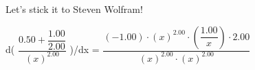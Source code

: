 \documentclass[a4paper]{article}
\begin{document}
\newpage

 Let's stick it to Steven Wolfram!

d( $
\dfrac{ 0.50 + \dfrac{ 1.00 }{ 2.00 }  }{  \left( x \right)^{2.00 }  } $
)/dx = $
\dfrac{ (-1.00) \cdot  \left( x \right)^{2.00 }  \cdot  \left( \dfrac{ 1.00 }{ x }  \right)  \cdot 2.00 }{  \left( x \right)^{2.00 }  \cdot  \left( x \right)^{2.00 }  } $
\end{document}
